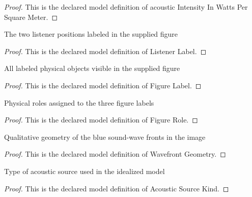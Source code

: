 \begin{proof}
  This is the declared model definition of acoustic Intensity In Watts Per Square Meter.
\end{proof}
\begin{definition}
  \label{def:physics:phyx-mini-0191:phyxminiproblems-problemphyxmini0191-listenerlabel}
  The two listener positions labeled in the supplied figure
\end{definition}
\begin{proof}
  This is the declared model definition of Listener Label.
\end{proof}
\begin{definition}
  \label{def:physics:phyx-mini-0191:phyxminiproblems-problemphyxmini0191-figurelabel}
  All labeled physical objects visible in the supplied figure
\end{definition}
\begin{proof}
  This is the declared model definition of Figure Label.
\end{proof}
\begin{definition}
  \label{def:physics:phyx-mini-0191:phyxminiproblems-problemphyxmini0191-figurerole}
  Physical roles assigned to the three figure labels
\end{definition}
\begin{proof}
  This is the declared model definition of Figure Role.
\end{proof}
\begin{definition}
  \label{def:physics:phyx-mini-0191:phyxminiproblems-problemphyxmini0191-wavefrontgeometry}
  Qualitative geometry of the blue sound-wave fronts in the image
\end{definition}
\begin{proof}
  This is the declared model definition of Wavefront Geometry.
\end{proof}
\begin{definition}
  \label{def:physics:phyx-mini-0191:phyxminiproblems-problemphyxmini0191-acousticsourcekind}
  Type of acoustic source used in the idealized model
\end{definition}
\begin{proof}
  This is the declared model definition of Acoustic Source Kind.
\end{proof}
